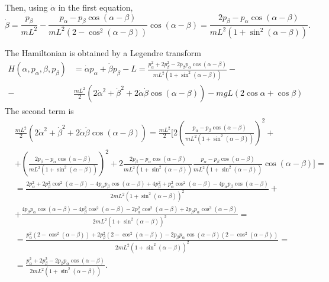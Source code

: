 \documentclass[a4paper,11pt,pdftex]{article}
\begin{document}
Then, using $\dot{\alpha}$ in the first equation,
$$
\dot{\beta} = \frac{p_\beta}{mL^2} -  \frac{p_\alpha- p_\beta \cos(\alpha-\beta)}{mL^2(2-\cos^2(\alpha - \beta))}\cos(\alpha - \beta) = \frac{2p_\beta - p_\alpha \cos(\alpha-\beta)}{mL^2(1+\sin^2(\alpha - \beta))}. 
$$

The Hamiltonian is obtained by a Legendre transform
\begin{align*}
    H(\alpha, p_\alpha, \beta, p_\beta) &= \dot{\alpha}p_\alpha + \dot{\beta}p_\beta - L = \frac{p^2_\alpha+ 2p^2_\beta - 2p_\beta p_\alpha \cos(\alpha-\beta)}{mL^2(1+\sin^2(\alpha - \beta))} - \\
    -&\frac{mL^2}{2}(2\dot{\alpha}^2 + \dot{\beta}^2 + 2\dot{\alpha}\dot{\beta}\cos(\alpha - \beta)) - mgL(2\cos \alpha + \cos \beta ) 
\end{align*}
The second  term is
\begin{align*}
    &\frac{mL^2}{2}(2\dot{\alpha}^2 + \dot{\beta}^2 + 2\dot{\alpha}\dot{\beta}\cos(\alpha - \beta)) = \frac{mL^2}{2}[2\left(\frac{p_\alpha- p_\beta \cos(\alpha-\beta)}{mL^2(1+\sin^2(\alpha - \beta))}\right)^2 + \\
    & +\left(\frac{2p_\beta - p_\alpha \cos(\alpha-\beta)}{mL^2(1+\sin^2(\alpha - \beta))}\right)^2 +  2 \frac{2p_\beta - p_\alpha \cos(\alpha-\beta)}{mL^2(1+\sin^2(\alpha - \beta))}\frac{p_\alpha- p_\beta \cos(\alpha-\beta)}{mL^2(1+\sin^2(\alpha - \beta))}\cos(\alpha-\beta)]= \\
    & = \frac{2p^2_\alpha + 2p^2_\beta\cos^2(\alpha-\beta) - 4p_\alpha p_\beta \cos(\alpha-\beta) + 4p^2_\beta + p^2_\alpha \cos^2(\alpha-\beta) - 4p_\alpha p_\beta \cos (\alpha-\beta)}{2mL^2(1+\sin^2(\alpha - \beta))^2} + \\
    & + \frac{4p_\beta p_\alpha \cos(\alpha-\beta) -4p^2_\beta\cos^2(\alpha - \beta) - 2 p^2_\alpha\cos^2(\alpha-\beta) + 2p_\beta p_\alpha \cos^3(\alpha-\beta)}{2mL^2(1+\sin^2(\alpha - \beta))^2} = \\
    &= \frac{p^2_\alpha(2-\cos^2(\alpha-\beta)) + 2p^2_\beta(2-\cos^2(\alpha-\beta)) - 2p_\beta p_\alpha\cos(\alpha-\beta)(2 -\cos^2(\alpha-\beta))}{2mL^2(1+\sin^2(\alpha - \beta))^2} = \\
    &= \frac{p^2_\alpha + 2p^2_\beta - 2p_\beta p_\alpha\cos(\alpha-\beta)}{2mL^2(1+\sin^2(\alpha - \beta))}.
\end{align*}
\end{document}
